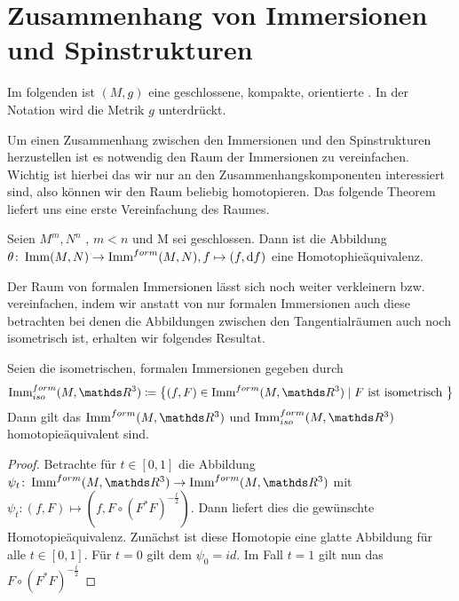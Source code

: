 


\section{Zusammenhang von Immersionen und Spinstrukturen}

Im folgenden ist $(M,g)$ eine geschlossene, kompakte, orientierte \mfg.
In der Notation wird die Metrik $g$ unterdrückt.


Um einen Zusammenhang zwischen den Immersionen und den Spinstrukturen
herzustellen ist es notwendig den Raum der Immersionen zu vereinfachen.
Wichtig ist hierbei das wir nur an den Zusammenhangskomponenten interessiert
sind, also können wir den Raum beliebig homotopieren. Das folgende Theorem
liefert uns eine erste Vereinfachung des Raumes. 
\begin{Thm}
	Seien $M^m,N^n$ \mfgen, $m<n$ und M sei geschlossen. Dann ist die Abbildung
	$\theta \colon \operatorname{Imm}(M,N) \rightarrow \operatorname{Imm}^{form}(M,N), f \mapsto (f,\mathrm{d} f)$ eine Homotophieäquivalenz.
\end{Thm}

Der Raum von formalen Immersionen lässt sich noch weiter verkleinern bzw. vereinfachen, indem wir anstatt von nur formalen Immersionen auch diese betrachten bei denen die Abbildungen zwischen den Tangentialräumen auch noch isometrisch ist, erhalten wir folgendes Resultat.


\begin{Satz}
	Seien die isometrischen, formalen Immersionen gegeben durch
	\begin{gather*}
	\Immfi{M}{\R^3} \coloneqq \set{(f,F) \in \Immf{M}{\R^3}}{F \text{ ist isometrisch }}
	\end{gather*}
	Dann gilt das $\Immf{M}{\R^3}$ und $\Immfi{M}{\R^3}$ homotopieäquivalent sind.
	\begin{proof}
		Betrachte für $t \in [0,1]$ die Abbildung $\abb{\psi_t}{\Immf{M}{\R^3}}{\Immf{M}{\R^3}}$ mit 
		$\psi_t : (f,F) \mapsto (f,F \circ (F^{\ast}F)^{-\frac{t}{2}})$.
		Dann liefert dies die gewünschte Homotopieäquivalenz.
		Zunächst ist diese Homotopie eine glatte Abbildung für alle $ t \in [0,1] $. Für $ t=0 $ gilt dem $ \psi_0 = id $. Im Fall $ t=1 $ gilt nun das $ F \circ (F^{\ast}F)^{-\frac{t}{2}} $ 
	\end{proof}
\end{Satz}



